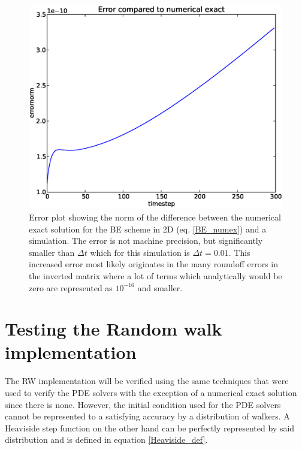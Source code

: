 \begin{figure}[H]
 \centering
 \includegraphics[scale=0.5]{../doc/results/experiment_30042014_0914_BE2D_numex/results/numerical_exact.eps}
 \caption[Numerical exact errorplot for BE scheme in 2D]{Error plot showing the norm of the difference between the numerical exact solution for the BE scheme in 2D (eq. \ref{BE_numex}) and a simulation. 
 The error is not machine precision, but significantly smaller than $\Delta t$ which for this simulation is $\Delta t=0.01$. 
 This increased error most likely originates in the many roundoff errors in the inverted matrix where a lot of terms which analytically would be zero are represented as $10^{-16}$ and smaller.}
 \label{numex:BE2D}
\end{figure}


\section{Testing the Random walk implementation}\label{testing_random_walks}


The RW implementation will be verified using the same techniques that were used to verify the PDE solvers with the exception of a numerical exact solution since there is none. 
However, the initial condition used for the PDE solvers cannot be represented to a satisfying accuracy by a distribution of walkers. 
A Heaviside step function on the other hand can be perfectly represented by said distribution and is defined in equation \eqref{Heaviside_def}. 


